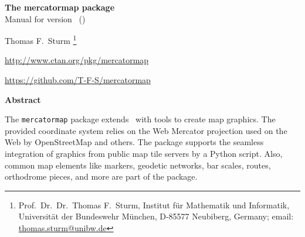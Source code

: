 \clearpage
\begin{center}
\begin{tcolorbox}[enhanced,hbox,tikznode,left=8mm,right=8mm,boxrule=0.4pt,
  colback=white,colframe=Blue_Gray,
  drop lifted shadow=Blue_Gray!50,arc is angular,
  before=\par\vspace*{5mm},after=\par\bigskip]
{\bfseries\LARGE The mercatormap package}\\[3mm]
{\large Manual for version \version\ (\datum)}
\end{tcolorbox}
{\large Thomas F.~Sturm%
  \footnote{Prof.~Dr.~Dr.~Thomas F.~Sturm, Institut f\"{u}r Mathematik und Informatik,
    Universit\"{a}t der Bundeswehr M\"{u}nchen, D-85577 Neubiberg, Germany;
     email: \href{mailto:thomas.sturm@unibw.de}{thomas.sturm@unibw.de}}\par\medskip
\normalsize\url{http://www.ctan.org/pkg/mercatormap}\par
\url{https://github.com/T-F-S/mercatormap}
}
\end{center}
\bigskip
\begin{absquote}
  \begin{center}\bfseries Abstract\end{center}
  The \texttt{mercatormap} package extends \tikzname\ with tools to
  create map graphics. The provided coordinate system relies on the
  Web Mercator projection used on the Web by OpenStreetMap and others.
  The package supports the seamless integration of graphics
  from public map tile servers by a Python script. Also, common map
  elements like markers, geodetic networks, bar scales, routes, orthodrome
  pieces, and more are part of the package.
\end{absquote}

\begin{tcolorbox}[breakable,enhanced jigsaw,before=\par\bigskip\noindent,
  title={Contents},fonttitle=\bfseries\Large,center title,
  colback=Blue_Gray!2!white,
  colframe=Blue_Gray,
  colbacktitle=Blue_Gray!5!white,
  coltitle=black,
  boxrule=0.4pt,arc is angular,
  enlargepage flexible=\baselineskip,pad at break*=3mm,
  ]
\makeatletter
{}
\makeatother
\end{tcolorbox}
